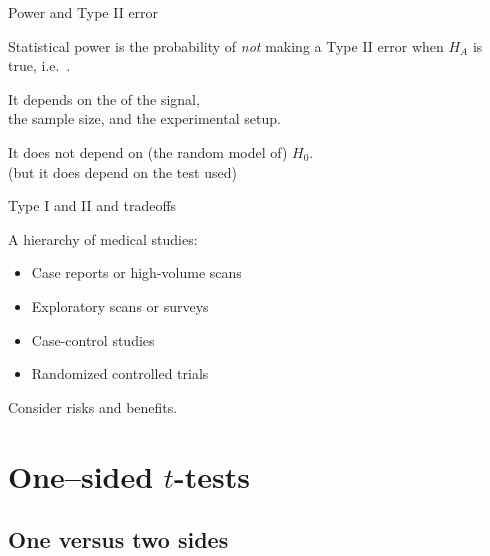 \begin{frame}{Power and Type II error}

    \begin{block}{}
        \alert{Statistical power} is the probability of \emph{not} making a Type II error when $H_A$ is true,
        i.e.\ .
    \end{block}
    

    \vspace{2em}

    It depends on the  of the signal,\\
    the sample size, and the experimental setup.


    \vspace{2em}

    It does \alert{not} depend on (the random model of) $H_0$.\\
    (but it does depend on the test used)

\end{frame}


\begin{frame}{Type I and II and tradeoffs}

    A hierarchy of medical studies:
    \begin{itemize}
        \item Case reports or high-volume scans
        \item Exploratory scans or surveys
        \item Case-control studies
        \item Randomized controlled trials
    \end{itemize}


    \vspace{2em}

    Consider risks and benefits.


\end{frame}



\section{One--sided $t$-tests}

\subsection{One versus two sides}


